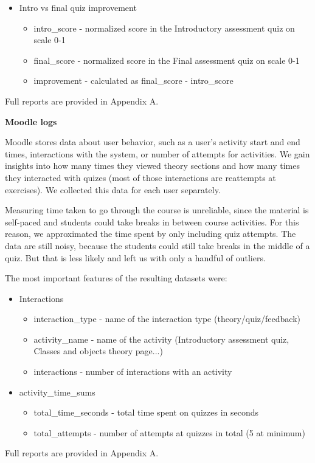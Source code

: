 \begin{itemize}
\begin{itemize}
        \end{itemize}
    \item Intro vs final quiz improvement
        \begin{itemize}
            \item intro\_score - normalized score in the Introductory assessment quiz on scale 0-1
            \item final\_score - normalized score in the Final assessment quiz on scale 0-1
            \item improvement - calculated as final\_score - intro\_score
        \end{itemize}
\end{itemize}

Full reports are provided in Appendix A.


\textbf{Moodle logs}

Moodle stores data about user behavior, such as a user's activity start and end times, interactions with the system, or number of attempts for activities. We gain insights into how many times they viewed theory sections and how many times they interacted with quizes (most of those interactions are reattempts at exercises). We collected this data for each user separately.

Measuring time taken to go through the course is unreliable, since the material is self-paced and students could take breaks in between course activities. For this reason, we approximated the time spent by only including quiz attempts. The data are still noisy, because the students could still take breaks in the middle of a quiz. But that is less likely and left us with only a handful of outliers.

The most important features of the resulting datasets were:
\begin{itemize}
    \item Interactions 		
        \begin{itemize}
            \item interaction\_type - name of the interaction type (theory/quiz/feedback)
            \item activity\_name - name of the activity (Introductory assessment quiz, Classes and objects theory page...)
            \item interactions - number of interactions with an activity
        \end{itemize}
    \item activity\_time\_sums
        \begin{itemize}
            \item total\_time\_seconds - total time spent on quizzes in seconds
            \item total\_attempts - number of attempts at quizzes in total (5 at minimum)
        \end{itemize}
\end{itemize}

Full reports are provided in Appendix A.